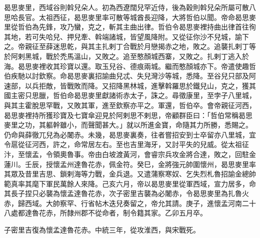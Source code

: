 \begin{pinyinscope}
 曷思麥里，西域谷則斡兒朵人。初為西遼闊兒罕近侍，後為穀則斡兒朵所屬可散八思哈長官。太祖西征，曷思麥里率可散等城酋長迎降，大將哲伯以聞。帝命曷思麥里從哲伯為先鋒，攻乃蠻，克之，斬其主曲出律。哲伯令曷思麥裡持曲出律首往徇其地，若可失哈兒、押兒牽、斡端諸城，皆望風降附。又從征你沙不兒城，諭下之。帝親征至薛迷思乾，與其主扎剌丁合戰於月戀揭赤之地，敗之。追襲扎剌丁等於阿剌黑城，戰於禿馬溫山，又敗之。追至憨顏城西寨，又敗之。扎剌丁逃入於海。曷思麥裡收其珍寶以還。取玉兒谷、德痕兩城。繼而憨顏城亦下。帝遣使趣哲伯疾馳以討欽察。命曷思麥裏招諭曲兒忒、失兒灣沙等城，悉降。至谷兒只部及阿速部，以兵拒敵，皆戰敗而降。又招降黑林城，進擊斡羅思於鐵兒山，克之，獲其國主密只思臘，哲伯命曷思麥里獻諸術赤太子，誅之。尋徵康里，至孛子八里城，與其主霍脫思罕戰，又敗其軍，進至欽察亦平之。軍還，哲伯卒。會帝親征河西，曷思麥裡持所獲珍寶及七寶傘迎見於阿剌思不剌思，帝顧群臣曰：「哲伯常稱曷思麥里之功，其軀幹雖小，而聲聞甚大。」就以所進金寶，命隨其力所勝，悉賜之。仍命與薛徹兀兒為必闍赤。未幾，曷思麥裏奏，往者嘗招安到士卒留亦八里城，宜令扈從征河西，許之，命常居左右。至也吉里海牙，又討平失的兒威。從太祖征汴，至懷孟，令領奧魯事。帝由白坡渡黃河，會睿宗兵攻金將合達，敗之，回駐金蓮川。壬辰，授懷孟州達魯花赤，佩金符。癸巳，金將強元帥圍懷州，曷思麥里率其眾及昔里吉思、鎖剌海等力戰，金兵退。又遣蒲察寒奴、乞失烈札魯招諭金總帥範真率其麾下軍民萬餘人來降。己亥六月，帝以曷思麥里從軍西域，宣力居多，命其長子捏只必襲為懷孟達魯花赤，次子密里吉襲為必闍赤，令曷思麥里為扎魯火赤，歸西域。大帥察罕、行省帖木迭兒奏留之，帝允其請。庚子，進懷孟河南二十八處都達魯花赤，所隸州郡不從命者，制令籍其家。乙卯五月卒。



 子密里吉復為懷孟達魯花赤。中統三年，從攻淮西，與宋戰死。



\end{pinyinscope}